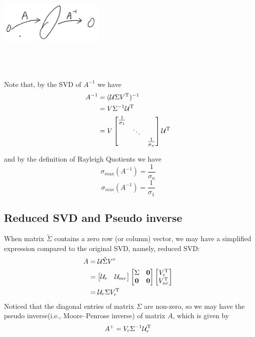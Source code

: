 \begin{marginfigure}
	\centering
	\includegraphics[width=2in,height=2in]{figures/ch05/figure2.jpg}
\end{marginfigure}

Note that, by the SVD of $A^{-1}$ we have
\begin{align*}
A^{-1} 
&= (\mathcal{U}\Sigma V^{{\rm T}})^{-1} \\
&= V\Sigma^{-1}\mathcal{U}^{{\rm T}}\\
&= V
\begin{bmatrix}
\frac{1}{\sigma_1} & &\\
& \ddots & \\
& & \frac{1}{\sigma_n}
\end{bmatrix}
\mathcal{U}^{{\rm T}}
\end{align*}

and by the definition of Rayleigh Quotients we have 
$$\sigma_{max}(A^{-1}) = \frac{1}{\sigma_n}$$
$$\sigma_{min}(A^{-1}) = \frac{1}{\sigma_1}$$

\subsection{Reduced SVD and Pseudo inverse}
When matrix $\tilde{\Sigma}$ contains a zero row (or column) vector, we may have a simplified expression compared to the original SVD, namely, reduced SVD:
\begin{align*}
A &= \mathcal{U}\tilde{\Sigma}V^r\\
&= 
\begin{bmatrix}
\mathcal{U}_r & \mathcal{U}_{mr}
\end{bmatrix}
\begin{bmatrix}
\Sigma & \mathbf{0}\\
\mathbf{0} & \mathbf{0}
\end{bmatrix}
\begin{bmatrix}
V_r^{{\rm T}}\\
V_{nr}^{{\rm T}}
\end{bmatrix}\\
&= \mathcal{U}_r\Sigma V_r^{{\rm T}}\\
\end{align*}
Noticed that the diagonal entries of matrix $\Sigma$ are non-zero, so we may have the pseudo inverse(i.e., Moore–Penrose inverse) of matrix $A$, which is given by
$$A^{+} = V_r \Sigma^{-1} \mathcal{U}_r^{{\rm T}} $$


